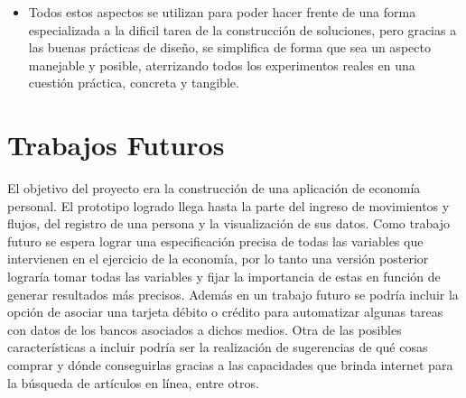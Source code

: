 \begin{itemize}
	\item Todos estos aspectos se utilizan para poder hacer frente de una forma especializada a la dificil tarea de la construcción de soluciones, pero gracias a las buenas prácticas de diseño, se simplifica de forma que sea un aspecto manejable y posible, aterrizando todos los experimentos reales en una cuestión práctica, concreta y tangible.
\end{itemize}
\section{Trabajos Futuros}
El objetivo del proyecto era la construcción de una aplicación de economía personal. El prototipo logrado llega hasta la parte del ingreso de movimientos y flujos, del registro de una persona y la visualización de sus datos. Como trabajo futuro se espera lograr una especificación precisa de todas las variables que intervienen en el ejercicio de la economía, por lo tanto una versión posterior lograría tomar todas las variables y fijar la importancia de estas en función de generar resultados más precisos. Además en un trabajo futuro se podría incluir la opción de asociar una tarjeta débito o crédito para automatizar algunas tareas con datos de los bancos asociados a dichos medios. Otra de las posibles características a incluir podría ser la realización de sugerencias de qué cosas comprar y dónde conseguirlas gracias a las capacidades que brinda internet para la búsqueda de artículos en línea, entre otros.